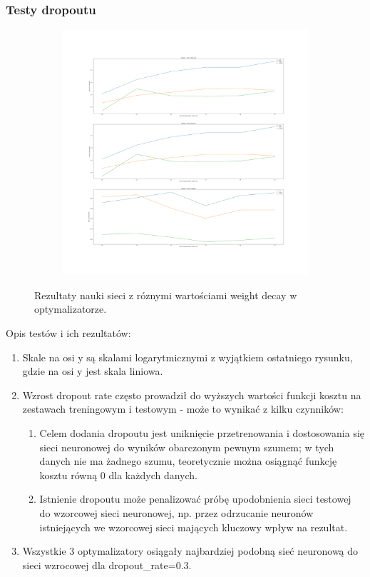 \documentclass[12pt]{article}
\begin{document}
\subsubsection{Testy dropoutu}
\begin{figure}[H]
	\centering
	\begin{subfigure}[b]{1\linewidth}
		\includegraphics[width=\linewidth]{Comparision_dropout.png}
	\end{subfigure}
	\caption{Rezultaty nauki sieci z róznymi wartościami weight decay w optymalizatorze.}
	\label{fig:dropout}
\end{figure}
Opis testów i ich rezultatów:
\begin{enumerate}
	\item Skale na osi y są skalami logarytmicznymi z wyjątkiem ostatniego rysunku, gdzie na osi y jest skala liniowa.
	\item Wzrost dropout rate często prowadził do wyższych wartości funkcji kosztu na zestawach treningowym i testowym - może to wynikać z kilku czynników:
	\begin{enumerate}
		\item Celem dodania dropoutu jest uniknięcie przetrenowania i dostosowania się sieci neuronowej do wyników obarczonym pewnym szumem; w tych danych nie ma żadnego szumu, teoretycznie można osiągnąć funkcję kosztu równą 0 dla każdych danych.
		\item Istnienie dropoutu może penalizować próbę upodobnienia sieci testowej do wzorcowej sieci neuronowej, np. przez odrzucanie neuronów istniejących we wzorcowej sieci mających kluczowy wpływ na rezultat.
	\end{enumerate}
	\item Wszystkie 3 optymalizatory osiągały najbardziej podobną sieć neuronową do sieci wzrocowej dla dropout\_rate=0.3.
\end{enumerate}
\end{document}
